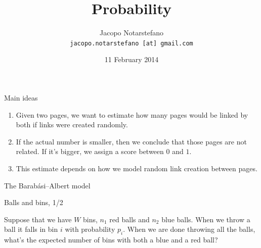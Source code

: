 \documentclass[12pt]{beamer}
\title{Probability}
\author[Jacopo Notarstefano]{
    Jacopo Notarstefano\\
    \texttt{jacopo.notarstefano [at] gmail.com}
}
\date{11 February 2014}
\begin{document}
    \begin{frame}[plain]
        \titlepage
    \end{frame}

    \begin{frame}{Main ideas}
        \begin{enumerate}
            \item Given two pages, we want to estimate how many pages would be linked
            by both if links were created randomly.
            \item If the actual number is smaller, then we conclude that those pages
            are not related. If it's bigger, we assign a score between \(0\) and \(1\).
            \item This estimate depends on how we model random link creation between
            pages.
        \end{enumerate}
    \end{frame}

    \begin{frame}{The Barabási–Albert model}
    \end{frame}

    \begin{frame}{Balls and bins, 1/2}
        \begin{problem}
            Suppose that we have \(W\) bins, \(n_1\) red balls and \(n_2\) blue balls.
            When we throw a ball it falls in bin \(i\) with probability \(p_i\). When
            we are done throwing all the balls, what's the expected number of bins with
            both a blue and a red ball?
        \end{problem}
        \begin{figure}
        \end{figure}
    \end{frame}
\end{document}
